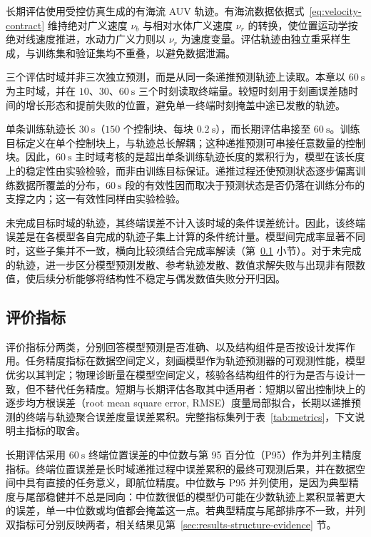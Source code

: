 \documentclass[UTF8,zihao=-4]{ctexrep}
\begin{document}
长期评估使用受控仿真生成的有海流 AUV 轨迹。有海流数据依据式~\eqref{eq:velocity-contract} 维持绝对广义速度 \(\nu_b\) 与相对水体广义速度 \(\nu_r\) 的转换，使位置运动学按绝对线速度推进，水动力广义力则以 \(\nu_r\) 为速度变量。评估轨迹由独立重采样生成，与训练集和验证集均不重叠，以避免数据泄漏。

三个评估时域并非三次独立预测，而是从同一条递推预测轨迹上读取。本章以 \(60~\mathrm{s}\) 为主时域，并在 \(10\)、\(30\)、\(60~\mathrm{s}\) 三个时刻读取终端量。较短时刻用于刻画误差随时间的增长形态和提前失败的位置，避免单一终端时刻掩盖中途已发散的轨迹。

单条训练轨迹长 \(30~\mathrm{s}\)（\(150\) 个控制块、每块 \(0.2~\mathrm{s}\)），而长期评估串接至 \(60~\mathrm{s}\)。训练目标定义在单个控制块上，与轨迹总长解耦；这种递推预测可串接任意数量的控制块。因此，\(60~\mathrm{s}\) 主时域考核的是超出单条训练轨迹长度的累积行为，模型在该长度上的稳定性由实验检验，而非由训练目标保证。递推过程还使预测状态逐步偏离训练数据所覆盖的分布，\(60~\mathrm{s}\) 段的有效性因而取决于预测状态是否仍落在训练分布的支撑之内；这一有效性同样由实验检验。

未完成目标时域的轨迹，其终端误差不计入该时域的条件误差统计。因此，该终端误差是在各模型各自完成的轨迹子集上计算的条件统计量。模型间完成率显著不同时，这些子集并不一致，横向比较须结合完成率解读（第~\ref{subsec:metrics} 小节）。对于未完成的轨迹，进一步区分模型预测发散、参考轨迹发散、数值求解失败与出现非有限数值，使后续分析能够将结构性不稳定与偶发数值失败分开归因。

\subsection{评价指标}
\label{subsec:metrics}

评价指标分两类，分别回答模型预测是否准确、以及结构组件是否按设计发挥作用。任务精度指标在数据空间定义，刻画模型作为轨迹预测器的可观测性能，模型优劣以其判定；物理诊断量在模型空间定义，核验各结构组件的行为是否与设计一致，但不替代任务精度。短期与长期评估各取其中适用者：短期以留出控制块上的逐步均方根误差（root mean square error, RMSE）度量局部拟合，长期以递推预测的终端与轨迹聚合误差度量误差累积。完整指标集列于表~\ref{tab:metrics}，下文说明主指标的取舍。

长期评估采用 \(60~\mathrm{s}\) 终端位置误差的中位数与第 95 百分位（P95）作为并列主精度指标。终端位置误差是长时域递推过程中误差累积的最终可观测后果，并在数据空间中具有直接的任务意义，即航位精度。中位数与 P95 并列使用，是因为典型精度与尾部稳健并不总是同向：中位数很低的模型仍可能在少数轨迹上累积显著更大的误差，单一中位数或均值都会掩盖这一点。若典型精度与尾部排序不一致，并列双指标可分别反映两者，相关结果见第~\ref{sec:results-structure-evidence} 节。
\end{document}
